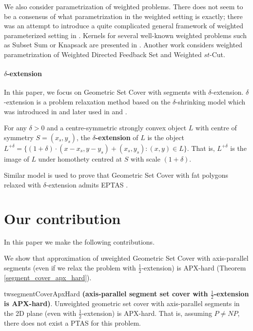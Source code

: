 We also consider parametrization of weighted problems.
There does not seem to be a consensus of what parametrization
in the weighted setting is exactly; there
was an attempt to introduce a quite complicated general
framework of weighted parameterized setting in \cite{weighted_framework}.
Kernels for several well-known weighted problems
such as Subset Sum or Knapsack are presented in \cite{kernel_weighted}.
Another work \cite{weighted_flow} considers weighted
parametrization of Weighted Directed Feedback Set and Weighted $st$-Cut.

\paragraph{$\delta$-extension}
In this paper, we focus on Geometric Set Cover with segments with $\delta$-extension.
$\delta$-extension is a problem relaxation method based on the
$\delta$-shrinking model which was introduced in \cite{shrinking_original}
and later used in \cite{shrinking2} and \cite{shrinking1}.

\begin{defi}
\label{definition:delta_extension}
For any $\delta > 0$ and a centre-symmetric strongly convex object $L$ with
centre of symmetry $S = (x_s, y_s)$,
the \textbf{$\delta$-extension} of $L$ is the object $L^{+\delta} =
\{(1 + \delta)\cdot(x - x_s, y - y_s) + (x_s, y_s) : (x, y) \in L\}$.
That is, $L^{+\delta}$ is the image of $L$ under homothety centred
at $S$ with scale $(1+\delta)$.
\end{defi}

Similar model is used to prove that Geometric Set Cover with fat polygons
relaxed with $\delta$-extension admits EPTAS \cite{harpeled12}.

\section*{Our contribution}
In this paper we make the following contributions.

We show that approximation of uweighted Geometric Set Cover with axis-parallel segments
(even if we relax the problem with  $\frac{1}{2}$-extension) is APX-hard
(Theorem \ref{segment_cover_apx_hard}).

\begin{restatable}{tw}{segmentCoverApxHard}{
\label{segment_cover_apx_hard}
	\textbf{(axis-parallel segment set cover with $\frac{1}{2}$-extension is APX-hard)}.	
	Unweighted geometric set cover
	with axis-parallel segments in the 2D plane
	(even with $\frac{1}{2}$-extension) is APX-hard.
	That is, assuming $P\neq NP$, there does not exist a PTAS
	for this problem.
}\end{restatable}

